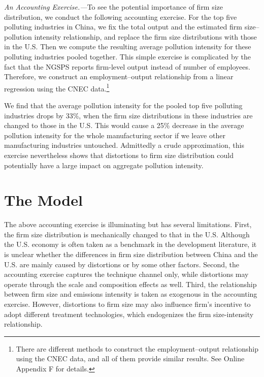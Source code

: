 \documentclass[AEJ]{AEA}
\begin{document}
\textit{An Accounting Exercise.---}To see the potential importance of firm size distribution, we conduct the following accounting exercise. For the top five polluting industries in China, we fix the total output and  the estimated firm size--pollution intensity relationship, and replace the firm size distributions with those in the U.S. Then we compute the resulting average pollution intensity for these polluting industries pooled together. %
 This simple exercise is complicated by the fact that the NGSPS reports firm-level output instead of number of employees. Therefore, we construct an employment--output relationship from a linear regression using the CNEC data.\footnote{There are different methods to construct the employment--output relationship using the CNEC data, and all of them provide similar results. See Online Appendix F for details.}

We find that the average pollution intensity for the pooled top five polluting industries drops by 33\%, when the firm size distributions in these industries are changed to those in the U.S. This would cause a 25\% decrease in the average pollution intensity for the whole manufacturing sector if we leave other manufacturing industries untouched. Admittedly a crude approximation, this exercise nevertheless shows that distortions to firm size distribution could potentially have a large impact on aggregate pollution intensity.

\section{The Model}

The above accounting exercise is illuminating but has several limitations. First, the firm size distribution is mechanically changed to that in the U.S. Although the U.S. economy is often taken as a benchmark in the development literature, it is unclear whether the differences in firm size distribution between China and the U.S. are mainly caused by distortions or by some other factors. Second, the accounting exercise captures the technique channel only, while distortions may operate through the scale and composition effects as well. Third, the relationship between firm size and emissions intensity is taken as exogenous in the accounting exercise. However, distortions to firm size may also influence firm's incentive to adopt different treatment technologies, which endogenizes the firm size-intensity relationship.
\end{document}
